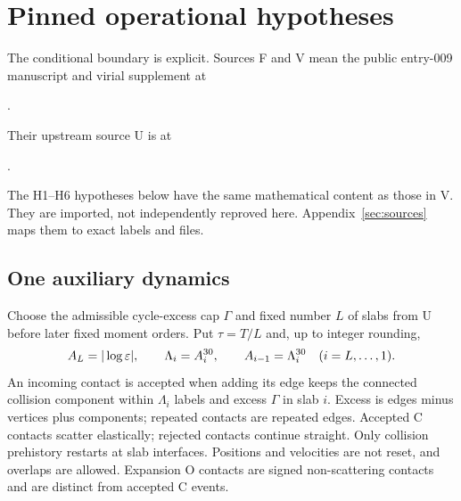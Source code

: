 \section{Pinned operational hypotheses}\label{sec:package}
The conditional boundary is explicit. Sources F and V mean the public
entry-009 manuscript and virial supplement \cite{F,V} at
\begin{center}\small\texttt{\srcpin}.\end{center}
Their upstream source U is \cite{U} at
\begin{center}\small\texttt{\uppin}.\end{center}
The H1--H6 hypotheses below have the same mathematical content as those in V.
They are imported, not independently reproved here. Appendix~\ref{sec:sources}
maps them to exact labels and files.

\subsection{One auxiliary dynamics}
Choose the admissible cycle-excess cap $\Gamma$ and fixed number $L$ of slabs
from U before later fixed moment orders. Put $\tau=T/L$ and, up to integer
rounding,
\begin{equation}\label{eq:caps}
 A_L=|\log\varepsilon|,\qquad \Lambda_i=A_i^{30},\qquad
 A_{i-1}=\Lambda_i^{30}\quad(i=L,\ldots,1).
\end{equation}
An incoming contact is accepted when adding its edge keeps the connected
collision component within $\Lambda_i$ labels and excess $\Gamma$ in slab $i$.
Excess is edges minus vertices plus components; repeated contacts are repeated
edges. Accepted C contacts scatter elastically; rejected contacts continue
straight. Only collision prehistory restarts at slab interfaces. Positions
and velocities are not reset, and overlaps are allowed. Expansion O contacts
are signed non-scattering contacts and are distinct from accepted C events.

